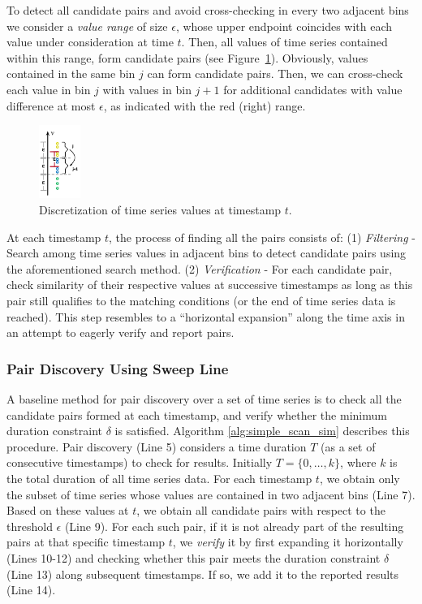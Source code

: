 To detect all candidate pairs and avoid cross-checking in every two adjacent bins we consider a \textit{value range} of size $\epsilon$, whose upper endpoint coincides with each value under consideration at time $t$. Then, all values of time series contained within this range, form candidate pairs (see Figure~\ref{fig:index}). Obviously, values contained in the same bin $j$ can form candidate pairs. Then, we can cross-check each value in bin $j$ with values in bin $j+1$ for additional candidates with value difference at most $\epsilon$, as indicated with the red (right) range.


\begin{figure}[tb]
    \centering
    \includegraphics[width=0.12\textwidth]{figures/index.png}
    \caption{Discretization of time series values at timestamp $t$.}
    \label{fig:index}
\end{figure}

At each timestamp $t$, the process of finding all the pairs consists of: (1) \textit{Filtering} - Search among time series values in adjacent bins to detect candidate pairs using the aforementioned search method. (2) \textit{Verification} - For each candidate pair, check similarity of their respective values at successive timestamps as long as this pair still qualifies to the matching conditions (or the end of time series data is reached). This step resembles to a ``horizontal expansion'' along the time axis in an attempt to eagerly verify and report pairs.

\subsubsection{Pair Discovery Using Sweep Line}
\label{subsec:sweep_line_join}
A baseline method for pair discovery over a set of time series is to check all the candidate pairs formed at each timestamp, and verify whether the minimum duration constraint $\delta$ is satisfied. Algorithm \ref{alg:simple_scan_sim} describes this procedure. Pair discovery (Line 5) considers a time duration $T$ (as a set of consecutive timestamps) to check for results. Initially $T = \{0, \dots, k\}$, where $k$ is the total duration of all time series data. For each timestamp $t$, we obtain only the subset of time series whose values are contained in two adjacent bins (Line 7). Based on these values at $t$, we obtain all candidate pairs with respect to the threshold $\epsilon$ (Line 9). For each such pair, if it is not already part of the resulting pairs at that specific timestamp $t$, we \textit{verify} it by first expanding it horizontally (Lines 10-12) and checking whether this pair meets the duration constraint $\delta$ (Line 13) along subsequent timestamps. If so, we add it to the reported results (Line 14).

